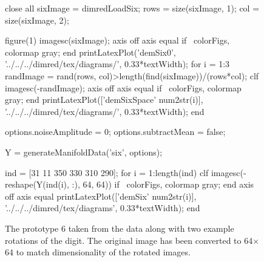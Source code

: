 \begin{figure}
  \begin{octave}
    close all
    sixImage = dimredLoadSix;
    rows = size(sixImage, 1);
    col = size(sixImage, 2);


    figure(1)
    imagesc(sixImage);
    axis off
    axis equal
    if ~colorFigs, colormap gray; end
    printLatexPlot('demSix0', '../../../dimred/tex/diagrams/', 0.33*textWidth);
    for i = 1:3
      randImage = rand(rows, col)>length(find(sixImage))/(rows*col);
      clf
      imagesc(-randImage);
      axis off
      axis equal
      if ~colorFigs, colormap gray; end
      printLatexPlot(['demSixSpace' num2str(i)], '../../../dimred/tex/diagrams/', 0.33*textWidth);
    end

    options.noiseAmplitude = 0;
    options.subtractMean = false;

    Y = generateManifoldData('six', options);

    ind = [31 11 350 330 310 290];
    for i = 1:length(ind)
      clf
      imagesc(-reshape(Y(ind(i), :), 64, 64))
      if ~colorFigs, colormap gray; end
      axis off
      axis equal
      printLatexPlot(['demSix' num2str(i)], '../../../dimred/tex/diagrams', 0.33*textWidth);
    end

  \end{octave}
  \begin{center}
    \subfigure[Original 6]{}\hfill
    \hfill
  \end{center}
  \caption{The prototype 6 taken from the  data along with
    two example rotations of the digit. The original image has been
    converted to 64$\times$64 to match dimensionality of the rotated
    images.}\label{fig:prototypeSix}
\end{figure}

